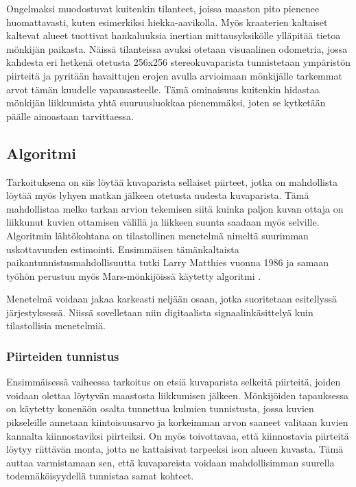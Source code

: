 \documentclass[finnish]{tktltiki2}
\theoremstyle{definition}
\theoremstyle{remark}
\begin{document}
Ongelmaksi muodostuvat kuitenkin tilanteet, joissa maaston pito pienenee huomattavasti, kuten esimerkiksi hiekka-aavikolla. Myös kraaterien kaltaiset kaltevat alueet tuottivat hankaluuksia inertian mittausyksikölle ylläpitää tietoa mönkijän paikasta. Näissä tilanteissa avuksi otetaan visuaalinen odometria, jossa kahdesta eri hetkenä otetusta 256x256 stereokuvaparista tunnistetaan ympäristön piirteitä ja pyritään havaittujen erojen avulla arvioimaan mönkijälle tarkemmat arvot tämän kuudelle vapausasteelle. Tämä ominaisuus kuitenkin hidastaa mönkijän liikkumista yhtä suuruusluokkaa pienemmäksi, joten se kytketään päälle ainoastaan tarvittaessa. \cite{cheng2005visual}

\subsection{Algoritmi}
Tarkoituksena on siis löytää kuvaparista sellaiset piirteet, jotka on mahdollista löytää myös lyhyen matkan jälkeen otetusta uudesta kuvaparista. Tämä mahdollistaa melko tarkan arvion tekemisen siitä kuinka paljon kuvan ottaja on liikkunut kuvien ottamisen välillä ja liikkeen suunta saadaan myös selville. Algoritmin lähtökohtana on tilastollinen menetelmä nimeltä suurimman uskottavuuden estimointi. Ensimmäisen tämänkaltaista paikantunnistusmahdollisuutta tutki Larry Matthies vuonna 1986 ja samaan työhön perustuu myös Mars-mönkijöissä käytetty algoritmi \cite{matthies}.

Menetelmä voidaan jakaa karkeasti neljään osaan, jotka suoritetaan esitellyssä järjestyksessä. Niissä sovelletaan niin digitaalista signaalinkäsittelyä kuin tilastollisia menetelmiä.

\subsubsection{Piirteiden tunnistus}
Ensimmäisessä vaiheessa tarkoitus on etsiä kuvaparista selkeitä piirteitä, joiden voidaan olettaa löytyvän maastosta liikkumisen jälkeen. Mönkijöiden tapauksessa on käytetty konenäön osalta tunnettua kulmien tunnistusta, jossa kuvien pikseleille annetaan kiintoisuusarvo ja korkeimman arvon saaneet valitaan kuvien kannalta kiinnostaviksi piirteiksi. On myös toivottavaa, että kiinnostavia piirteitä löytyy riittävän monta, jotta ne kattaisivat tarpeeksi ison alueen kuvasta. Tämä auttaa varmistamaan sen, että kuvapareista voidaan mahdollisimman suurella todennäköisyydellä tunnistaa samat kohteet.\cite{cheng2005visual}
\end{document}
